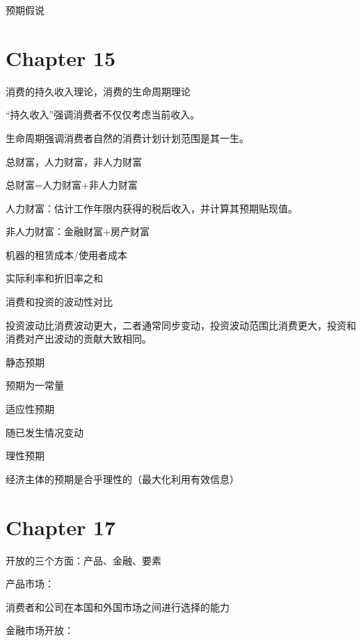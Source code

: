 \documentclass{article}
\begin{document}
预期假说

\section{Chapter 15}

消费的持久收入理论，消费的生命周期理论

“持久收入”强调消费者不仅仅考虑当前收入。

生命周期强调消费者自然的消费计划计划范围是其一生。

\hspace*{\fill}

总财富，人力财富，非人力财富

总财富=人力财富+非人力财富

人力财富：估计工作年限内获得的税后收入，并计算其预期贴现值。

非人力财富：金融财富+房产财富

\hspace*{\fill}

机器的租赁成本/使用者成本

实际利率和折旧率之和

\hspace*{\fill}

消费和投资的波动性对比

投资波动比消费波动更大，二者通常同步变动，投资波动范围比消费更大，投资和消费对产出波动的贡献大致相同。

\hspace*{\fill}

静态预期

预期为一常量

\hspace*{\fill}

适应性预期

随已发生情况变动

\hspace*{\fill}

理性预期

经济主体的预期是合乎理性的（最大化利用有效信息）

\section{Chapter 17}

开放的三个方面：产品、金融、要素

产品市场：

消费者和公司在本国和外国市场之间进行选择的能力

金融市场开放：
\end{document}
